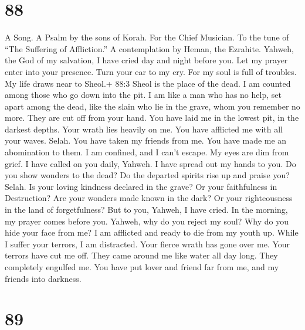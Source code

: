 \hypertarget{section-78}{%
\section{88}\label{section-78}}

A Song. A Psalm by the sons of Korah. For the Chief Musician. To the
tune of ``The Suffering of Affliction.'' A contemplation by Heman, the
Ezrahite.  Yahweh, the God of my salvation, I have cried day
and night before you.  Let my prayer enter into your
presence. Turn your ear to my cry.  For my soul is full of
troubles. My life draws near to Sheol.+ 88:3 Sheol is the place of the
dead.  I am counted among those who go down into the pit. I
am like a man who has no help,  set apart among the dead,
like the slain who lie in the grave, whom you remember no more. They are
cut off from your hand.  You have laid me in the lowest pit,
in the darkest depths.  Your wrath lies heavily on me. You
have afflicted me with all your waves. Selah.  You have
taken my friends from me. You have made me an abomination to them. I am
confined, and I can't escape.  My eyes are dim from grief. I
have called on you daily, Yahweh. I have spread out my hands to you.
 Do you show wonders to the dead? Do the departed spirits
rise up and praise you? Selah.  Is your loving kindness
declared in the grave? Or your faithfulness in Destruction?
 Are your wonders made known in the dark? Or your
righteousness in the land of forgetfulness?  But to you,
Yahweh, I have cried. In the morning, my prayer comes before you.
 Yahweh, why do you reject my soul? Why do you hide your
face from me?  I am afflicted and ready to die from my
youth up. While I suffer your terrors, I am distracted. 
Your fierce wrath has gone over me. Your terrors have cut me off.
 They came around me like water all day long. They
completely engulfed me.  You have put lover and friend far
from me, and my friends into darkness.

\hypertarget{section-79}{%
\section{89}\label{section-79}}

